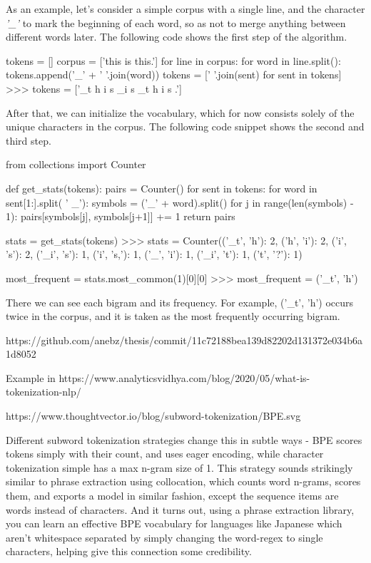 As an example, let's consider a simple corpus with a single line, and the character \emph{'\_'} to mark the beginning of each word, so as not to merge anything between different words later. The following code shows the first step of the algorithm.

\begin{python}
tokens = []
corpus = ['this is this.']
for line in corpus:
    for word in line.split():
        tokens.append('_' + ' '.join(word))
tokens = [' '.join(sent) for sent in tokens]
>>> tokens = ['_t h i s _i s _t h i s .']
\end{python}

After that, we can initialize the vocabulary, which for now consists solely of the unique characters in the corpus. The following code snippet shows the second and third step.

\begin{python}
from collections import Counter

def get_stats(tokens):
    pairs = Counter()
    for sent in tokens:
        for word in sent[1:].split( ' _'):
            symbols = ('_' + word).split()
            for j in range(len(symbols) - 1):
                pairs[symbols[j], symbols[j+1]] += 1
    return pairs

stats = get_stats(tokens)
>>> stats = Counter({('_t', 'h'): 2, ('h', 'i'): 2, ('i', 's'): 2, ('_i', 's'): 1, ('i', 's,'): 1, ('_', 'i'): 1, ('_i', 't'): 1, ('t', '?'): 1})

most_frequent = stats.most_common(1)[0][0]
>>> most_frequent = ('_t', 'h')
\end{python}

There we can see each bigram and its frequency. For example, ('\_t', 'h') occurs twice in the corpus, and it is taken as the most frequently occurring bigram.

https://github.com/anebz/thesis/commit/11c72188bea139d82202d131372e034b6a1d8052

Example in https://www.analyticsvidhya.com/blog/2020/05/what-is-tokenization-nlp/

https://www.thoughtvector.io/blog/subword-tokenization/BPE.svg

Different subword tokenization strategies change this in subtle ways - BPE scores tokens simply with their count, and uses eager encoding, while character tokenization simple has a max n-gram size of 1. This strategy sounds strikingly similar to phrase extraction using collocation, which counts word n-grams, scores them, and exports a model in similar fashion, except the sequence items are words instead of characters. And it turns out, using a phrase extraction library, you can learn an effective BPE vocabulary for languages like Japanese which aren’t whitespace separated by simply changing the word-regex to single characters, helping give this connection some credibility.

